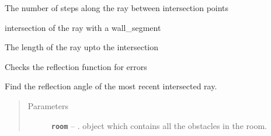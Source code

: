 \documentclass[letterpaper,10pt,english]{sphinxmanual}
\begin{document}
\begin{fulllineitems}
\begin{fulllineitems}
\label{index:Rays.Ray.number_steps}
The number of steps along the ray between intersection points

\end{fulllineitems}


\begin{fulllineitems}
\label{index:Rays.Ray.obst_collision_point}
intersection of the ray with a wall\_segment

\end{fulllineitems}


\begin{fulllineitems}
\label{index:Rays.Ray.ray_length}
The length of the ray upto the intersection

\end{fulllineitems}


\begin{fulllineitems}
\label{index:Rays.Ray.raytest}
Checks the reflection function for errors

\end{fulllineitems}


\begin{fulllineitems}
\label{index:Rays.Ray.ref_angle}
Find the reflection angle of the most recent intersected ray.
\begin{quote}\begin{description}
\item[{Parameters}] \leavevmode
\textbf{\texttt{room}} -- {\hyperref[index:module\string-Room]{}}.  object which     contains all the obstacles in the room.

\end{description}\end{quote}


\end{fulllineitems}
\end{fulllineitems}
\end{document}
